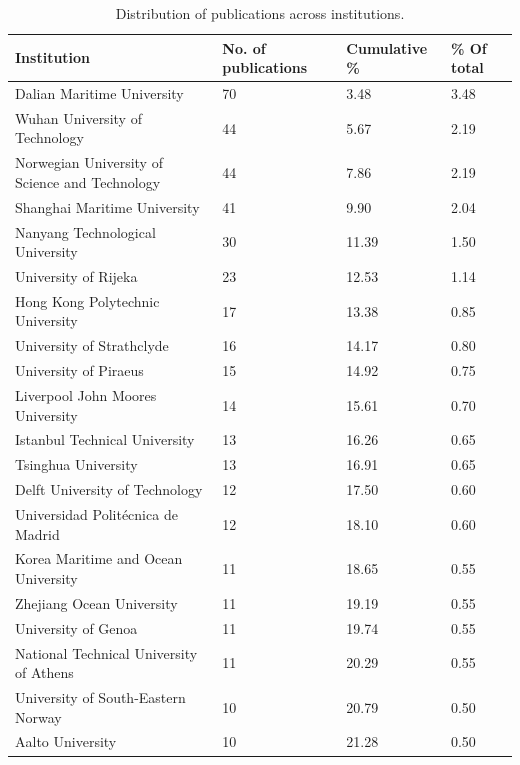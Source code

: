 \documentclass[a4paper, review, endfloat, authoryear]{elsarticle}
\begin{document}
	\begin{table}[h]
		\centering
		\caption{Distribution of publications across institutions.}
		\begin{tabularx}{\linewidth}{p{4cm}XXp{2cm}}
			\hline
			Institution & No. of publications & Cumulative \% & \% Of total \\
			\hline
			Dalian Maritime University & 70 & 3.48 & 3.48\\
			Wuhan University of Technology & 44 & 5.67 & 2.19\\
			Norwegian University of Science and Technology & 44 & 7.86 & 2.19\\
			Shanghai Maritime University & 41 & 9.90 & 2.04\\
			Nanyang Technological University & 30 & 11.39 & 1.50\\
			University of Rijeka & 23 & 12.53 & 1.14\\
			Hong Kong Polytechnic University & 17 & 13.38 & 0.85\\
			University of Strathclyde & 16 & 14.17 & 0.80\\
			University of Piraeus & 15 & 14.92 & 0.75\\
			Liverpool John Moores University & 14 & 15.61 & 0.70\\
			Istanbul Technical University & 13 & 16.26 & 0.65\\
			Tsinghua University & 13 & 16.91 & 0.65\\
			Delft University of Technology & 12 & 17.50 & 0.60\\
			Universidad Politécnica de Madrid & 12 & 18.10 & 0.60\\
			Korea Maritime and Ocean University & 11 & 18.65 & 0.55\\
			Zhejiang Ocean University & 11 & 19.19 & 0.55\\
			University of Genoa & 11 & 19.74 & 0.55\\
			National Technical University of Athens & 11 & 20.29 & 0.55\\
			University of South-Eastern Norway & 10 & 20.79 & 0.50\\
			Aalto University & 10 & 21.28 & 0.50\\
			\hline
		\end{tabularx}
		\label{tab:resdescinst}
	\end{table}
\end{document}
